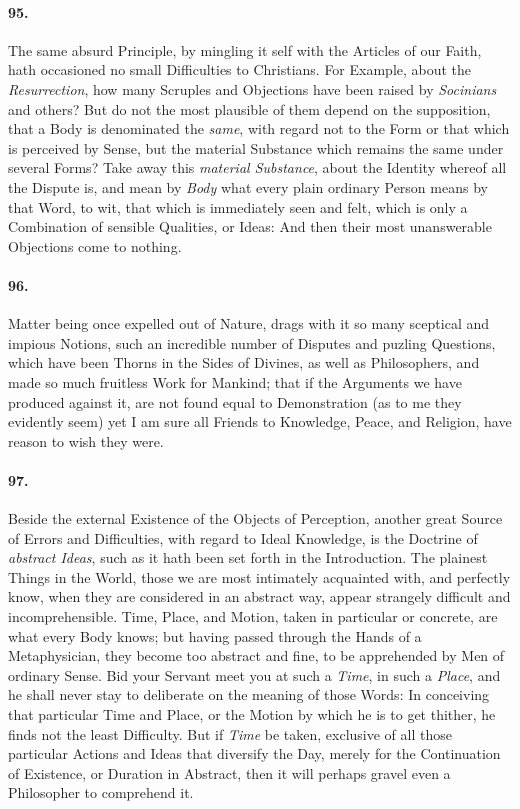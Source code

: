 \documentclass[]{article}
\newenvironment{sectionbody}{}{}
\begin{document}
\begin{sectionbody}
\paragraph{95.} The same absurd Principle, by mingling it self with the Articles
of our Faith, hath occasioned no small Difficulties to
Christians.  For Example, about the \emph{Resurrection}, how
many Scruples and Objections have been raised by
\emph{Socinians} and others? But do not the most plausible of
them depend on the supposition, that a Body is denominated the
\emph{same}, with regard not to the Form or that which is
perceived by Sense, but the material Substance which remains the
same under several Forms?  Take away this \emph{material
Substance}, about the Identity whereof all the Dispute is,
and mean by \emph{Body} what every plain ordinary Person means
by that Word, to wit, that which is immediately seen and felt,
which is only a Combination of sensible Qualities, or Ideas: And
then their most unanswerable Objections come to nothing.



\paragraph{96.} Matter being once expelled out of Nature, drags with it so many
sceptical and impious Notions, such an incredible number of
Disputes and puzling Questions, which have been Thorns in the
Sides of Divines, as well as Philosophers, and made so much
fruitless Work for Mankind; that if the Arguments we have
produced against it, are not found equal to Demonstration (as to
me they evidently seem) yet I am sure all Friends to Knowledge,
Peace, and Religion, have reason to wish they were.



\paragraph{97.} Beside the external Existence of the Objects of Perception,
another great Source of Errors and Difficulties, with regard to
Ideal Knowledge, is the Doctrine of \emph{abstract Ideas}, such
as it hath been set forth in the Introduction.  The plainest
Things in the World, those we are most intimately acquainted
with, and perfectly know, when they are considered in an abstract
way, appear strangely difficult and incomprehensible.  Time,
Place, and Motion, taken in particular or concrete, are what
every Body knows; but having passed through the Hands of a
Metaphysician, they become too abstract and fine, to be
apprehended by Men of ordinary Sense.  Bid your Servant meet you
at such a \emph{Time}, in such a \emph{Place}, and he shall
never stay to deliberate on the meaning of those Words: In
conceiving that particular Time and Place, or the Motion by which
he is to get thither, he finds not the least Difficulty.  But if
\emph{Time} be taken, exclusive of all those particular Actions
and Ideas that diversify the Day, merely for the Continuation of
Existence, or Duration in Abstract, then it will perhaps gravel
even a Philosopher to comprehend it.




\end{sectionbody}
\end{document}
